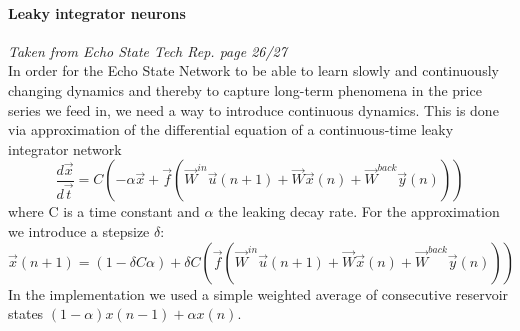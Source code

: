 \paragraph*{Leaky integrator neurons}
\emph{Taken from Echo State Tech Rep. page 26/27}\\
In order for the Echo State Network to be able to learn slowly and continuously changing dynamics and thereby to capture long-term phenomena in the price series we feed in, we need a way to introduce continuous dynamics. This is done via approximation of the differential equation of a continuous-time leaky integrator network
\begin{equation}\label{eq:leaky}
    \frac{d\vec{x}}{d\vec{t}} = C (-\alpha\vec{x} + \vec{f}(\vec{W}^{in}\vec{u}(n+1)+\vec{W}\vec{x}(n)+\vec{W}^{back}\vec{y}(n)))
\end{equation}
where C is a time constant and $\alpha$ the leaking decay rate. For the approximation we introduce a stepsize $\delta$:
\begin{equation}
    \vec{x}(n+1)=(1-\delta C \alpha) + \delta C (\vec{f}(\vec{W}^{in}\vec{u}(n+1)+\vec{W}\vec{x}(n)+\vec{W}^{back}\vec{y}(n)))
\end{equation}
In the implementation we used a simple weighted average of consecutive reservoir states $(1-\alpha)x(n-1)+\alpha x(n)$.

